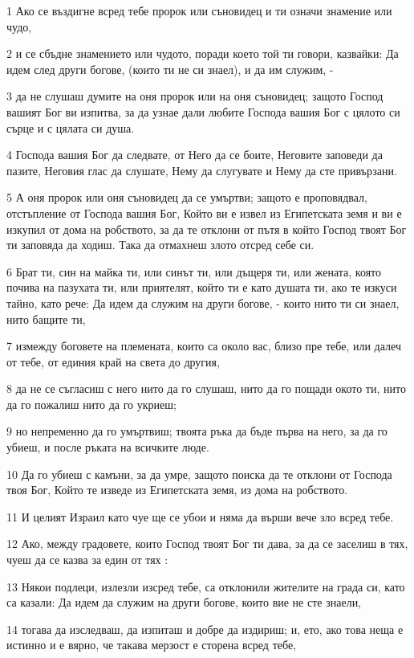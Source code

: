 \par 1 Ако се въздигне всред тебе пророк или съновидец и ти означи знамение или чудо,
\par 2 и се сбъдне знамението или чудото, поради което той ти говори, казвайки: Да идем след други богове, (които ти не си знаел), и да им служим, -
\par 3 да не слушаш думите на оня пророк или на оня съновидец; защото Господ вашият Бог ви изпитва, за да узнае дали любите Господа вашия Бог с цялото си сърце и с цялата си душа.
\par 4 Господа вашия Бог да следвате, от Него да се боите, Неговите заповеди да пазите, Неговия глас да слушате, Нему да слугувате и Нему да сте привързани.
\par 5 А оня пророк или оня съновидец да се умъртви; защото е проповядвал, отстъпление от Господа вашия Бог, Който ви е извел из Египетската земя и ви е изкупил от дома на робството, за да те отклони от пътя в който Господ твоят Бог ти заповяда да ходиш. Така да отмахнеш злото отсред себе си.
\par 6 Брат ти, син на майка ти, или синът ти, или дъщеря ти, или жената, която почива на пазухата ти, или приятелят, който ти е като душата ти, ако те изкуси тайно, като рече: Да идем да служим на други богове, - които нито ти си знаел, нито бащите ти,
\par 7 измежду боговете на племената, които са около вас, близо пре тебе, или далеч от тебе, от единия край на света до другия,
\par 8 да не се съгласиш с него нито да го слушаш, нито да го пощади окото ти, нито да го пожалиш нито да го укриеш;
\par 9 но непременно да го умъртвиш; твоята ръка да бъде първа на него, за да го убиеш, и после ръката на всичките люде.
\par 10 Да го убиеш с камъни, за да умре, защото поиска да те отклони от Господа твоя Бог, Който те изведе из Египетската земя, из дома на робството.
\par 11 И целият Израил като чуе ще се убои и няма да върши вече зло всред тебе.
\par 12 Ако, между градовете, които Господ твоят Бог ти дава, за да се заселиш в тях, чуеш да се казва за един от тях :
\par 13 Някои подлеци, излезли изсред тебе, са отклонили жителите на града си, като са казали: Да идем да служим на други богове, които вие не сте знаели,
\par 14 тогава да изследваш, да изпиташ и добре да издириш; и, ето, ако това неща е истинно и е вярно, че такава мерзост е сторена всред тебе,
